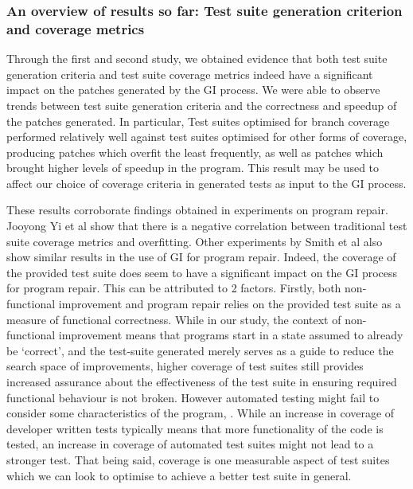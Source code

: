 \documentclass[titlepage]{article}
\begin{document}
\subsubsection{An overview of results so far: Test suite generation criterion and coverage metrics}
Through the first and second study, we obtained evidence that both test suite generation criteria and test suite coverage metrics indeed have a significant impact on the patches generated by the GI process.  We were able to observe trends between test suite generation criteria and the correctness and speedup of the patches generated. In particular, Test suites optimised for branch coverage performed relatively well against test suites optimised for other forms of coverage, producing patches which overfit the least frequently, as well as patches which brought higher levels of speedup in the program. This result may be used to affect our choice of coverage criteria in generated tests as input to the GI process. 

These results corroborate findings obtained in experiments on program repair. Jooyong Yi et al \cite{yicorrelation} show that there is a negative correlation between traditional test suite coverage metrics and overfitting. Other experiments by Smith et al \cite{cure} also show similar results in the use of GI for program repair. Indeed, the coverage of the provided test suite does seem to have a significant impact on the GI process for program repair. This can be attributed to 2 factors. Firstly, both non-functional improvement and program repair relies on the provided test suite as a measure of functional correctness. While in our study, the context of non-functional improvement means that programs start in a state assumed to already be ‘correct’, and the test-suite generated merely serves as a guide to reduce the search space of improvements, higher coverage of test suites still provides increased assurance about the effectiveness of the test suite in ensuring required functional behaviour is not broken. However automated testing might fail to consider some characteristics of the program, \cite{coveragecombination}. While an increase in coverage of developer written tests typically means that more functionality of the code is tested, an increase in coverage of automated test suites might not lead to a stronger test. That being said, coverage is one measurable aspect of test suites which we can look to optimise to achieve a better test suite in general.
\end{document}
